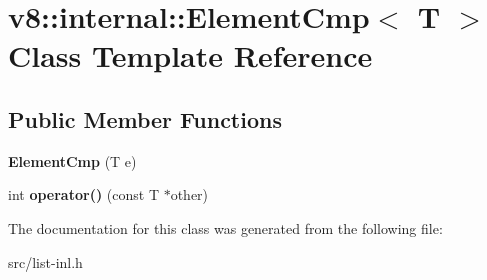 \hypertarget{classv8_1_1internal_1_1_element_cmp}{}\section{v8\+:\+:internal\+:\+:Element\+Cmp$<$ T $>$ Class Template Reference}
\label{classv8_1_1internal_1_1_element_cmp}
\subsection*{Public Member Functions}
\begin{DoxyCompactItemize}
\item 
\hypertarget{classv8_1_1internal_1_1_element_cmp_aecd8238a4888d4967062f6e2bdb86827}{}{\bfseries Element\+Cmp} (T e)\label{classv8_1_1internal_1_1_element_cmp_aecd8238a4888d4967062f6e2bdb86827}

\item 
\hypertarget{classv8_1_1internal_1_1_element_cmp_a9f140837259f8ff80943669ff9c9fe51}{}int {\bfseries operator()} (const T $\ast$other)\label{classv8_1_1internal_1_1_element_cmp_a9f140837259f8ff80943669ff9c9fe51}

\end{DoxyCompactItemize}


The documentation for this class was generated from the following file\+:\begin{DoxyCompactItemize}
\item 
src/list-\/inl.\+h\end{DoxyCompactItemize}
